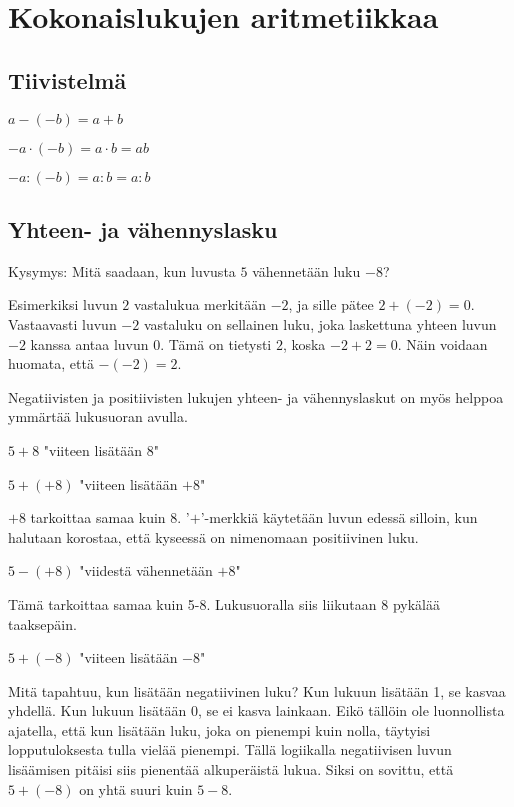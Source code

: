 \chapter{Kokonaislukujen aritmetiikkaa}

\section{Tiivistelmä}

$a-(-b)=a+b$

$-a\cdot (-b)=a\cdot b=ab$

$-a:(-b)=a: b=a:b$

\section{Yhteen- ja vähennyslasku}

Kysymys: Mitä saadaan, kun luvusta $5$ vähennetään luku $-8$?


Esimerkiksi luvun $2$ vastalukua merkitään $-2$, ja sille pätee $2+(-2)=0$. Vastaavasti luvun $-2$ vastaluku on sellainen luku, joka laskettuna yhteen luvun $-2$ kanssa antaa luvun $0$. Tämä on tietysti $2$, koska $-2+2=0$. Näin voidaan huomata, että $-(-2)=2$.

Negatiivisten ja positiivisten lukujen yhteen- ja vähennyslaskut on myös helppoa ymmärtää lukusuoran avulla.


$5+8$ "viiteen lisätään $8$"


$5+(+8)$ "viiteen lisätään $+8$"

$+8$ tarkoittaa samaa kuin $8$. '$+$'-merkkiä käytetään luvun edessä silloin, kun halutaan korostaa, että kyseessä on nimenomaan positiivinen luku.


$5-(+8)$ "viidestä vähennetään $+8$"

Tämä tarkoittaa samaa kuin 5-8. Lukusuoralla siis liikutaan 8 pykälää taaksepäin.


$5+(-8)$ "viiteen lisätään $-8$"

Mitä tapahtuu, kun lisätään negatiivinen luku? Kun lukuun lisätään 1, se kasvaa yhdellä. Kun lukuun lisätään 0, se ei kasva lainkaan. Eikö tällöin ole luonnollista ajatella, että kun lisätään luku, joka on pienempi kuin nolla, täytyisi lopputuloksesta tulla vielää pienempi. Tällä logiikalla negatiivisen luvun lisäämisen pitäisi siis pienentää alkuperäistä lukua. Siksi on sovittu, että $5+(-8)$ on yhtä suuri kuin $5-8$.


